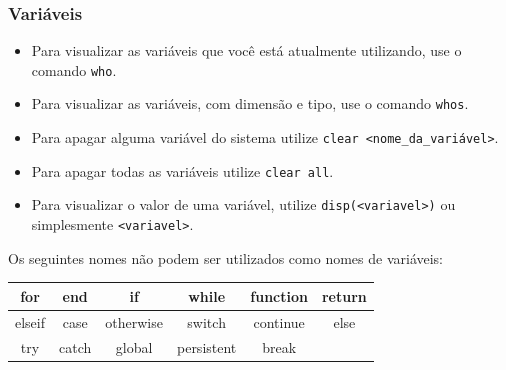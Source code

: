 \documentclass{beamer}
\begin{document}
\begin{frame}

\frametitle{Vari\'aveis}

\begin{itemize}
\item<1-> Para visualizar as vari\'aveis que voc\^e est\'a atualmente utilizando, use o comando {\tt who}.
\item<2-> Para visualizar as vari\'aveis, com dimens\~ao e tipo, use o comando {\tt whos}.
\item<3-> Para apagar alguma vari\'avel do sistema utilize {\tt clear <nome\_da\_vari\'avel>}.
\item<4-> Para apagar todas as vari\'aveis utilize {\tt clear all}.
\item<5-> Para visualizar o valor de uma vari\'avel, utilize {\tt disp(<variavel>)} ou simplesmente {\tt <variavel>}.
\end{itemize}

\pause \pause \pause \pause \pause
Os seguintes nomes n\~ao podem ser utilizados como nomes de vari\'aveis:
{\tt \begin{center} \scriptsize
\begin{tabular}{|c|c|c|c|c|c|}
\hline
for & end & if & while & function & return \\ \hline
elseif & case & otherwise & switch & continue & else \\ \hline
try & catch & global & persistent & break & \\ \hline
\end{tabular}
\end{center}}
\end{frame}
\end{document}
